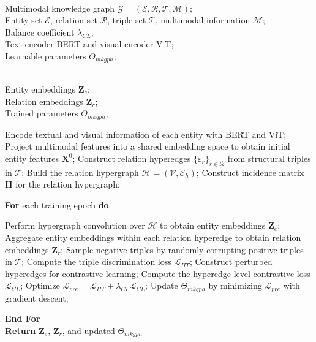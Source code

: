 \documentclass[a4paper,fleqn]{cas-sc}
\begin{document}
\begin{algorithm}[t]
\caption{Pre-training Procedure of MKGPH}
\label{alg:mkgph}
\begin{algorithmic}[1]

\REQUIRE \ \\
Multimodal knowledge graph $\mathcal{G}=(\mathcal{E},\mathcal{R},\mathcal{T},\mathcal{M})$;\\
Entity set $\mathcal{E}$, relation set $\mathcal{R}$, triple set $\mathcal{T}$, multimodal information $\mathcal{M}$;\\
Balance coefficient $\lambda_{CL}$;\\
Text encoder BERT and visual encoder ViT;\\
Learnable parameters $\Theta_{mkgph}$;

\ENSURE \ \\
Entity embeddings $\mathbf{Z}_{e}$;\\
Relation embeddings $\mathbf{Z}_{r}$;\\
Trained parameters $\Theta_{mkgph}$;

\STATE Encode textual and visual information of each entity with BERT and ViT;
\STATE Project multimodal features into a shared embedding space to obtain initial entity features $\mathbf{X}^{0}$;
\STATE Construct relation hyperedges $\{\varepsilon_r\}_{r\in\mathcal{R}}$ from structural triples in $\mathcal{T}$;
\STATE Build the relation hypergraph $\mathcal{H}=(\mathcal{V},\mathcal{E}_{h})$;
\STATE Construct incidence matrix $\mathbf{H}$ for the relation hypergraph;

\STATE \textbf{For} {each training epoch} \textbf{do}

    \STATE \hspace{0.5cm} Perform hypergraph convolution over $\mathcal{H}$ to obtain entity embeddings $\mathbf{Z}_{e}$;
    \STATE \hspace{0.5cm} Aggregate entity embeddings within each relation hyperedge to obtain relation embeddings $\mathbf{Z}_{r}$;
    \STATE \hspace{0.5cm} Sample negative triples by randomly corrupting positive triples in $\mathcal{T}$;
    \STATE \hspace{0.5cm} Compute the triple discrimination loss $\mathcal{L}_{HT}$;
    \STATE \hspace{0.5cm} Construct perturbed hyperedges for contrastive learning;
    \STATE \hspace{0.5cm} Compute the hyperedge-level contrastive loss $\mathcal{L}_{CL}$;
    \STATE \hspace{0.5cm} Optimize $\mathcal{L}_{pre}=\mathcal{L}_{HT}+\lambda_{CL}\mathcal{L}_{CL}$;
    \STATE \hspace{0.5cm} Update $\Theta_{mkgph}$ by minimizing $\mathcal{L}_{pre}$ with gradient descent;

\STATE \textbf{End For} \\
\STATE \textbf{Return} $\mathbf{Z}_{e}$, $\mathbf{Z}_{r}$, and updated $\Theta_{mkgph}$

\end{algorithmic}
\end{algorithm}
\end{document}
